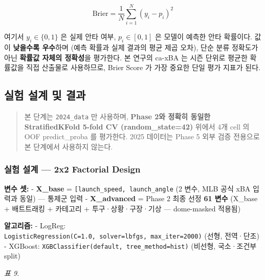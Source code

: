 \documentclass[
  11.5pt,
]{article}
\begin{document}
\[ \mathrm{Brier} = \frac{1}{N}\sum_{i=1}^{N} (y_i - p_i)^2 \]

여기서 \(y_i \in \{0, 1\}\) 은 실제 안타 여부, \(p_i \in [0, 1]\) 은
모델이 예측한 안타 확률이다. 값이 \textbf{낮을수록 우수}하며 (예측
확률과 실제 결과의 평균 제곱 오차), 단순 분류 정확도가 아닌
\textbf{확률값 자체의 정확성}을 평가한다. 본 연구의 ca-xBA 는 시즌
단위로 평균한 확률값을 직접 산출물로 사용하므로, Brier Score 가 가장
중요한 단일 평가 지표가 된다.

\subsection{실험 설계 및
결과}\label{uxc2e4uxd5d8-uxc124uxacc4-uxbc0f-uxacb0uxacfc}

\begin{quote}
본 단계는 \texttt{2024\_data} 만 사용하며, \textbf{Phase 2와 정확히
동일한 StratifiedKFold 5-fold CV (random\_state=42)} 위에서 4개 cell 의
OOF predict\_proba 를 평가한다. 2025 데이터는 Phase 5 외부 검증 전용으로
본 단계에서 사용하지 않는다.
\end{quote}

\subsubsection{실험 설계 --- 2x2 Factorial
Design}\label{uxc2e4uxd5d8-uxc124uxacc4-2x2-factorial-design}

\textbf{변수 셋:} - \textbf{X\_base} =
\texttt{{[}\textquotesingle{}launch\_speed\textquotesingle{},\ \textquotesingle{}launch\_angle\textquotesingle{}{]}}
(2 변수, MLB 공식 xBA 입력과 동일) --- 통제군 입력 -
\textbf{X\_advanced} = Phase 2 최종 선정 \textbf{61 변수} (X\_base +
배트트래킹 + 카테고리 + 투구·상황·구장·기상 --- dome-masked 적용됨)

\textbf{알고리즘:} - LogReg:
\texttt{LogisticRegression(C=1.0,\ solver=\textquotesingle{}lbfgs\textquotesingle{},\ max\_iter=2000)}
(선형, 전역·단조) - XGBoost:
\texttt{XGBClassifier(default,\ tree\_method=\textquotesingle{}hist\textquotesingle{})}
(비선형, 국소·조건부 split)

\emph{표 9.}
\end{document}
